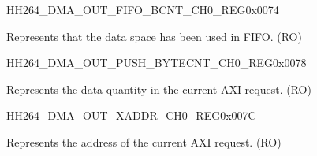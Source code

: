 \begin{register}{H}{H264\_DMA\_OUT\_FIFO\_BCNT\_CH0\_REG}{0x0074}\label{regdesc:H264DMAOUTFIFOBCNTCH0REG}
%
%
\regnewline%
\begin{regdesc}\begin{reglist}
\label{fielddesc:H264DMAOUTCMDFIFOOUTFIFOBCNTCH0}\item [H264\_DMA\_OUT\_CMDFIFO\_OUTFIFO\_BCNT\_CH0] Represents that the data space has been used in FIFO. (RO)
\end{reglist}\end{regdesc}
\end{register}


\begin{register}{H}{H264\_DMA\_OUT\_PUSH\_BYTECNT\_CH0\_REG}{0x0078}\label{regdesc:H264DMAOUTPUSHBYTECNTCH0REG}
%
%
\regnewline%
\begin{regdesc}\begin{reglist}
\label{fielddesc:H264DMAOUTCMDFIFOPUSHBYTECNTCH0}\item [H264\_DMA\_OUT\_CMDFIFO\_PUSH\_BYTECNT\_CH0] Represents the data quantity in the current AXI request. (RO)
\end{reglist}\end{regdesc}
\end{register}


\begin{register}{H}{H264\_DMA\_OUT\_XADDR\_CH0\_REG}{0x007C}\label{regdesc:H264DMAOUTXADDRCH0REG}
%
\regnewline%
\begin{regdesc}\begin{reglist}
\label{fielddesc:H264DMAOUTCMDFIFOXADDRCH0}\item [H264\_DMA\_OUT\_CMDFIFO\_XADDR\_CH0] Represents the address of the current AXI request. (RO)
\end{reglist}\end{regdesc}
\end{register}


